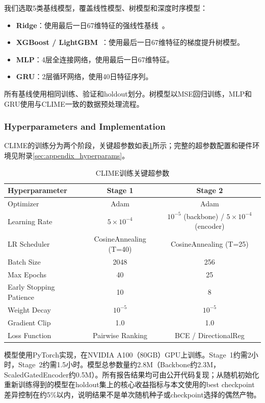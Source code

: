 我们选取5类基线模型，覆盖线性模型、树模型和深度时序模型：

\begin{itemize}[leftmargin=*, itemsep=4pt]
    \item \textbf{Ridge}：使用最后一日67维特征的强线性基线~\cite{poh2020learning}。
    \item \textbf{XGBoost / LightGBM}~\cite{xgboost,lightgbm}：使用最后一日67维特征的梯度提升树模型。
    \item \textbf{MLP}：4层全连接网络，使用最后一日67维特征。
    \item \textbf{GRU}：2层循环网络，使用40日特征序列。
\end{itemize}

所有基线使用相同训练、验证和holdout划分。树模型以MSE回归训练，MLP和GRU使用与CLIME一致的数据预处理流程。

\subsubsection{Hyperparameters and Implementation}

CLIME的训练分为两个阶段，关键超参数如表\ref{tab:hyperparams}所示；完整的超参数配置和硬件环境见附录\ref{sec:appendix_hyperparams}。

\begin{table}[H]
\centering
\caption{CLIME训练关键超参数}
\label{tab:hyperparams}
\begin{tabular}{@{}lcc@{}}
\toprule
Hyperparameter & Stage 1 & Stage 2 \\
\midrule
Optimizer & Adam & Adam \\
Learning Rate & $5\times10^{-4}$ & $10^{-5}$ (backbone) / $5\times10^{-4}$ (encoder) \\
LR Scheduler & CosineAnnealing (T=40) & CosineAnnealing (T=25) \\
Batch Size & 2048 & 256 \\
Max Epochs & 40 & 25 \\
Early Stopping Patience & 10 & 8 \\
Weight Decay & $10^{-5}$ & $10^{-5}$ \\
Gradient Clip & 1.0 & 1.0 \\
Loss Function & Pairwise Ranking & BCE / DirectionalReg \\
\bottomrule
\end{tabular}
\end{table}

模型使用PyTorch实现，在NVIDIA A100（80GB）GPU上训练。Stage~1约需2小时，Stage~2约需1.5小时。模型总参数量约2.8M（Backbone约2.3M，ScaledGatedEncoder约0.5M）。所有报告结果均可由公开代码复现；从随机初始化重新训练得到的模型在holdout集上的核心收益指标与本文使用的best checkpoint差异控制在约5\%以内，说明结果不是单次随机种子或checkpoint选择的偶然产物。

